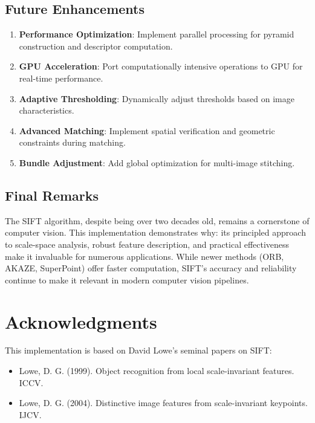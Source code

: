 \documentclass[12pt,a4paper]{article}
\begin{document}
\subsection{Future Enhancements}

\begin{enumerate}
    \item \textbf{Performance Optimization}: Implement parallel processing for pyramid construction and descriptor computation.
    
    \item \textbf{GPU Acceleration}: Port computationally intensive operations to GPU for real-time performance.
    
    \item \textbf{Adaptive Thresholding}: Dynamically adjust thresholds based on image characteristics.
    
    \item \textbf{Advanced Matching}: Implement spatial verification and geometric constraints during matching.
    
    \item \textbf{Bundle Adjustment}: Add global optimization for multi-image stitching.
\end{enumerate}

\subsection{Final Remarks}

The SIFT algorithm, despite being over two decades old, remains a cornerstone of computer vision. This implementation demonstrates why: its principled approach to scale-space analysis, robust feature description, and practical effectiveness make it invaluable for numerous applications. While newer methods (ORB, AKAZE, SuperPoint) offer faster computation, SIFT's accuracy and reliability continue to make it relevant in modern computer vision pipelines.

\section*{Acknowledgments}

This implementation is based on David Lowe's seminal papers on SIFT:
\begin{itemize}
    \item Lowe, D. G. (1999). Object recognition from local scale-invariant features. ICCV.
    \item Lowe, D. G. (2004). Distinctive image features from scale-invariant keypoints. IJCV.
\end{itemize}
\end{document}
